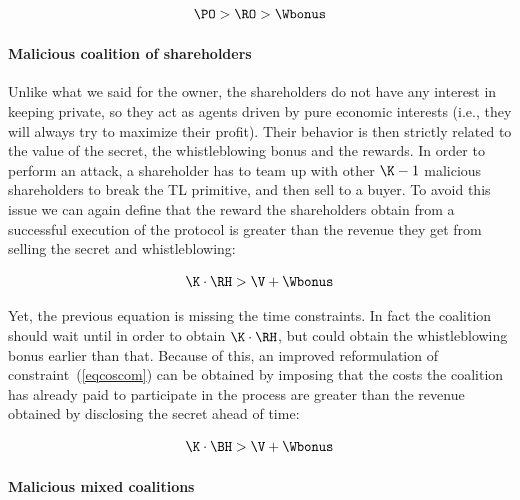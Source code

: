 \begin{equation}\label{eqbalance5}
\PO > \RO > \Wbonus
\end{equation}

\paragraph{Malicious coalition of shareholders}

Unlike what we said for the owner, the shareholders do not have any interest in keeping \secret private, so they act as agents driven by pure economic interests (i.e., they will always try to maximize their profit). Their behavior is then strictly related to the value of the secret, the whistleblowing bonus and the rewards. In order to perform an attack, a shareholder has to team up with other $\K - 1$ malicious shareholders to break the TL primitive, and then sell \secret to a buyer.
%
To avoid this issue we can again define that the reward the \K shareholders obtain from a successful execution of the protocol is greater than the revenue they get from selling the secret and whistleblowing:

\begin{equation}\label{eqcoscom}
\K \cdot \RH  > \V + \Wbonus
\end{equation}

Yet, the previous equation is missing the time constraints. In fact the coalition should wait until \td in order to obtain $\K \cdot \RH$, but could obtain the whistleblowing bonus earlier than that. Because of this, an improved reformulation of constraint~(\ref{eqcoscom}) can be obtained by imposing that the costs the coalition has already paid to participate in the process are greater than the revenue obtained by disclosing the secret ahead of time:


\begin{equation}\label{eqcoscom2}
\K \cdot \BH > \V + \Wbonus
\end{equation}

\paragraph{Malicious mixed coalitions}

